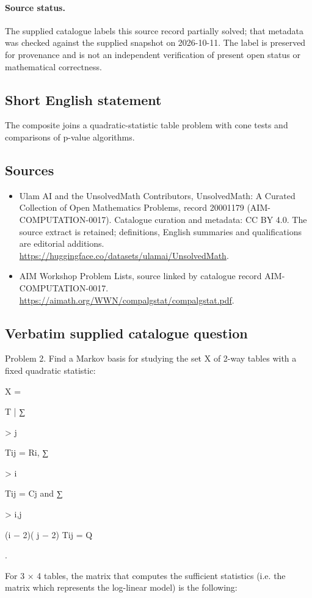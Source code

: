 \documentclass[11pt]{article}
\begin{document}
\paragraph{Source status.}
The supplied catalogue labels this source record partially solved; that metadata was checked against the supplied snapshot on 2026-10-11. The label is preserved for provenance and is not an independent verification of present open status or mathematical correctness.
\subsection{Short English statement}
The composite joins a quadratic-statistic table problem with cone tests and comparisons of p-value algorithms.
\subsection{Sources}
\begin{itemize}
\item[S1] Ulam AI and the UnsolvedMath Contributors, UnsolvedMath: A Curated Collection of Open Mathematics Problems, record 20001179 (AIM-COMPUTATION-0017). Catalogue curation and metadata: CC BY 4.0. The source extract is retained; definitions, English summaries and qualifications are editorial additions.
\url{https://huggingface.co/datasets/ulamai/UnsolvedMath}.
\item[S2] AIM Workshop Problem Lists, source linked by catalogue record AIM-COMPUTATION-0017.
\url{https://aimath.org/WWN/compalgstat/compalgstat.pdf}.
\end{itemize}
\subsection{Verbatim supplied catalogue question}
Problem 2. Find a Markov basis for studying the set X of 2-way tables with a fixed quadratic statistic:

X = {T | ∑

> j

Tij = Ri, ∑

> i

Tij = Cj and ∑

> i,j

(i − 2)( j − 2) Tij = Q}.

For 3 × 4 tables, the matrix that computes the sufficient statistics (i.e. the matrix which represents the log-linear model) is the following:


\end{document}
